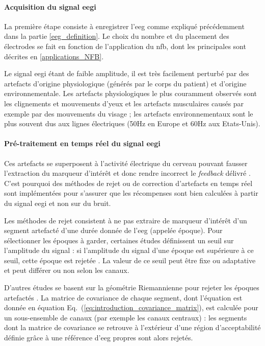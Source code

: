 \paragraph{Acquisition du signal \gls{eegi}}
La première étape consiste à enregistrer l'\gls{eeg} comme expliqué précédemment dans la partie \ref{eeg_definition}. Le choix
du nombre et du placement des électrodes se fait en fonction de l'application du \gls{nfb}, dont les principales sont décrites en
\ref{applications_NFB}. 

Le signal \gls{eegi} étant de faible amplitude, il est très facilement perturbé par des artefacts d'origine physiologique (générés par le
corps du patient) et d'origine environnementale. Les artefacts physiologiques le plus couramment observés sont les clignements et mouvements
d'yeux \citep{Iwasaki2005} et les artefacts musculaires \citep{Goncharova2003} causés par exemple par des mouvements du visage ; les artefacts environnementaux sont le plus souvent 
dus aux lignes électriques (50Hz en Europe et 60Hz aux Etats-Unis). 

\paragraph{Pré-traitement en temps réel du signal \gls{eegi}}
Ces artefacts se superposent à l'activité électrique du cerveau pouvant fausser l'extraction du marqueur d'intérêt et donc rendre
incorrect le \textit{feedback} délivré \citep{Enriquez2017, Montgomery2001, Sherlin2011, Paluch2017}. C'est pourquoi des méthodes de rejet ou de correction d'artefacts en temps 
réel sont implémentées pour s'assurer que les récompenses sont bien calculées à partir du signal \gls{eegi} et non sur du bruit. 

Les méthodes de rejet consistent à ne pas extraire de marqueur d'intérêt d'un segment artefacté d'une durée donnée de l'\gls{eeg} (appelée époque). 
Pour sélectionner les époques à garder, certaines études définissent un seuil sur l'amplitude du signal : si l'amplitude du signal d'une époque est supérieure
à ce seuil, cette époque est rejetée \citep{Gevensleben2009, Heinrich2004}. La valeur de ce seuil peut être fixe ou adaptative et peut 
différer ou non selon les canaux. 

D'autres études se basent sur la géométrie Riemannienne pour rejeter les époques artefactés \citep{Barachant2013, Barthelemy2019, Bioulac2019}. 
La matrice de covariance de chaque segment, dont l'équation est donnée en équation Eq.~(\ref{eq:introduction_covariance_matrix}), est calculée pour un sous-ensemble de canaux (par exemple les canaux
centraux) : les segments dont la matrice de covariance se retrouve à l'extérieur d'une région d'acceptabilité définie grâce à une référence d'\gls{eeg} propres sont alors rejetés.

